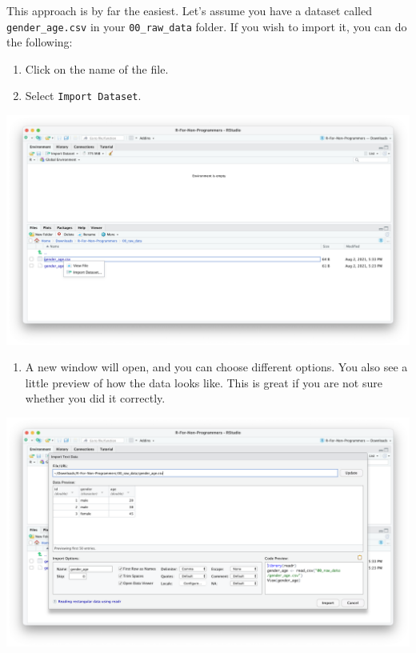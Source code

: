 \documentclass[
  letterpaper,
]{krantz}
\providecommand{\tightlist}{%
  \setlength{\itemsep}{0pt}\setlength{\parskip}{0pt}}\usepackage{longtable,booktabs,array}
\begin{document}
This approach is by far the easiest. Let's assume you have a dataset
called \texttt{gender\_age.csv} in your \texttt{00\_raw\_data} folder.
If you wish to import it, you can do the following:

\begin{enumerate}
\def\labelenumi{\arabic{enumi}.}
\item
  Click on the name of the file.
\item
  Select \texttt{Import\ Dataset}.
\end{enumerate}

\includegraphics{images/chapter_07_img/01_files_pane_import/01_files_pane_import.png}

\begin{enumerate}
\def\labelenumi{\arabic{enumi}.}
\setcounter{enumi}{2}
\tightlist
\item
  A new window will open, and you can choose different options. You also
  see a little preview of how the data looks like. This is great if you
  are not sure whether you did it correctly.
\end{enumerate}

\includegraphics{images/chapter_07_img/01_files_pane_import/02_files_pane_import.png}
\end{document}
